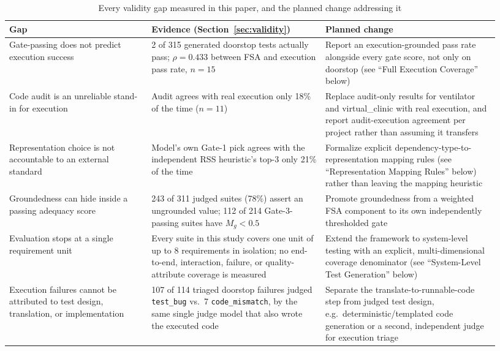 \documentclass[conference]{IEEEtran}
\begin{document}
\begin{table}[t]
\centering
\caption{Every validity gap measured in this paper, and the planned change addressing it}
\label{tab:gaps}
\small
\begin{tabular}{@{}p{0.27\linewidth}p{0.33\linewidth}p{0.33\linewidth}@{}}
\toprule
\textbf{Gap} & \textbf{Evidence (Section~\ref{sec:validity})} & \textbf{Planned change} \\
\midrule
Gate-passing does not predict execution success & 2 of 315 generated doorstop tests actually pass; $\rho=0.433$ between FSA and execution pass rate, $n=15$ &
Report an execution-grounded pass rate alongside every gate score, not only on doorstop (see ``Full Execution Coverage'' below) \\
\addlinespace
Code audit is an unreliable stand-in for execution & Audit agrees with real execution only 18\% of the time ($n=11$) &
Replace audit-only results for ventilator and virtual\_clinic with real execution, and report audit-execution agreement per project rather than assuming it transfers \\
\addlinespace
Representation choice is not accountable to an external standard & Model's own Gate-1 pick agrees with the independent RSS heuristic's top-3 only 21\% of the time &
Formalize explicit dependency-type-to-representation mapping rules (see ``Representation Mapping Rules'' below) rather than leaving the mapping heuristic \\
\addlinespace
Groundedness can hide inside a passing adequacy score & 243 of 311 judged suites (78\%) assert an ungrounded value; 112 of 214 Gate-3-passing suites have $M_g<0.5$ &
Promote groundedness from a weighted FSA component to its own independently thresholded gate \\
\addlinespace
Evaluation stops at a single requirement unit & Every suite in this study covers one unit of up to 8 requirements in isolation; no end-to-end, interaction, failure, or quality-attribute coverage is measured &
Extend the framework to system-level testing with an explicit, multi-dimensional coverage denominator (see ``System-Level Test Generation'' below) \\
\addlinespace
Execution failures cannot be attributed to test design, translation, or implementation & 107 of 114 triaged doorstop failures judged \texttt{test\_bug} vs.\ 7 \texttt{code\_mismatch}, by the same single judge model that also wrote the executed code &
Separate the translate-to-runnable-code step from judged test design, e.g.\ deterministic/templated code generation or a second, independent judge for execution triage \\
\bottomrule
\end{tabular}
\end{table}
\end{document}
